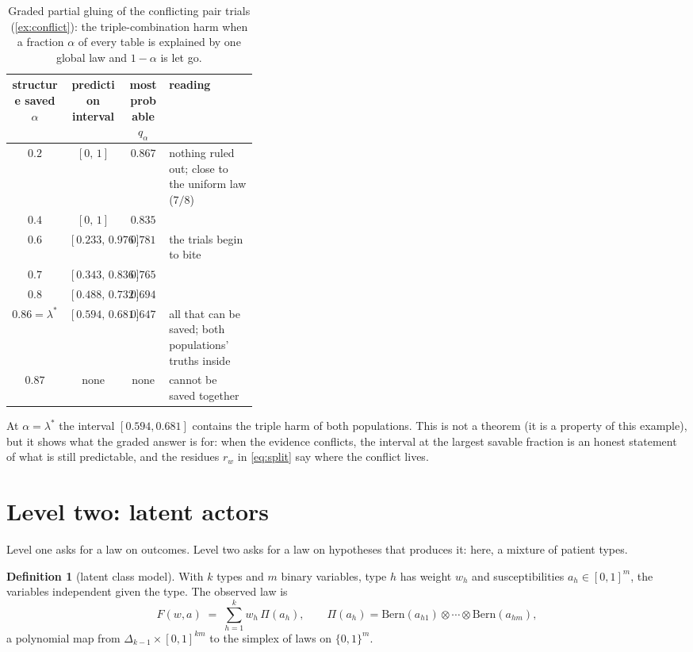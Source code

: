 \documentclass[11pt]{article}
\theoremstyle{definition}\newtheorem{definition}[theorem]{Definition}\newtheorem{remark}[theorem]{Remark}\newtheorem{example}[theorem]{Example}
\newcommand{\Bern}{\mathrm{Bern}}
\begin{document}
\begin{table}[!htbp]\centering\small
\begin{tabular}{cccp{0.36\linewidth}}\toprule
structure saved $\alpha$ & prediction interval & most probable $q_\alpha$ & reading\\\midrule
$0.2$ & $[0,\,1]$ & $0.867$ & nothing ruled out; close to the uniform law ($7/8$)\\
$0.4$ & $[0,\,1]$ & $0.835$ & \\
$0.6$ & $[0.233,\,0.976]$ & $0.781$ & the trials begin to bite\\
$0.7$ & $[0.343,\,0.836]$ & $0.765$ & \\
$0.8$ & $[0.488,\,0.732]$ & $0.694$ & \\
$0.86=\lambda^*$ & $[0.594,\,0.681]$ & $0.647$ & all that can be saved; both populations' truths inside\\
$0.87$ & none & none & cannot be saved together\\\bottomrule
\end{tabular}
\caption{Graded partial gluing of the conflicting pair trials (\cref{ex:conflict}): the triple-combination harm when a fraction
$\alpha$ of every table is explained by one global law and $1-\alpha$ is let go.}\label{tab:graded}
\end{table}

At $\alpha=\lambda^*$ the interval $[0.594,0.681]$ contains the triple harm of both populations. This is not a theorem (it is a
property of this example), but it shows what the graded answer is for: when the evidence conflicts, the interval at the largest
savable fraction is an honest statement of what is still predictable, and the residues $r_w$ in \eqref{eq:split} say where the
conflict lives.

\section{Level two: latent actors}\label{sec:level2}

Level one asks for a law on outcomes. Level two asks for a law on hypotheses that produces it: here, a mixture of patient types.

\begin{definition}[latent class model]
With $k$ types and $m$ binary variables, type $h$ has weight $w_h$ and susceptibilities $a_h\in[0,1]^m$, the variables independent given
the type. The observed law is
\[
  F(w,a) \;=\; \sum_{h=1}^k w_h\,\Pi(a_h),\qquad \Pi(a_h)=\Bern(a_{h1})\otimes\cdots\otimes\Bern(a_{hm}),
\]
a polynomial map from $\Delta_{k-1}\times[0,1]^{km}$ to the simplex of laws on $\{0,1\}^m$.
\end{definition}
\end{document}
